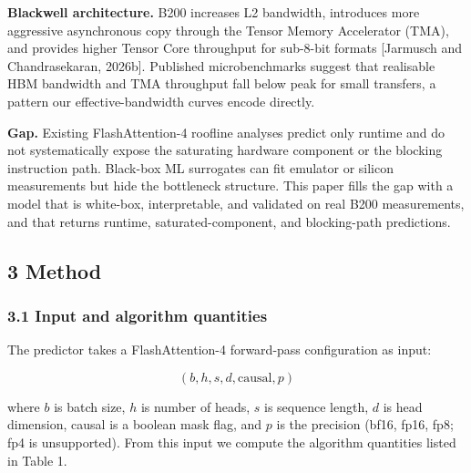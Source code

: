 \documentclass[
  10pt,journal,compsoc,twoside]{IEEEtran}
\begin{document}
\textbf{Blackwell architecture.} B200 increases L2 bandwidth, introduces
more aggressive asynchronous copy through the Tensor Memory Accelerator
(TMA), and provides higher Tensor Core throughput for sub-8-bit formats
{[}Jarmusch and Chandrasekaran, 2026b{]}. Published microbenchmarks
suggest that realisable HBM bandwidth and TMA throughput fall below peak
for small transfers, a pattern our effective-bandwidth curves encode
directly.

\textbf{Gap.} Existing FlashAttention-4 roofline analyses predict only
runtime and do not systematically expose the saturating hardware
component or the blocking instruction path. Black-box ML surrogates can
fit emulator or silicon measurements but hide the bottleneck structure.
This paper fills the gap with a model that is white-box, interpretable,
and validated on real B200 measurements, and that returns runtime,
saturated-component, and blocking-path predictions.

\subsection{3 Method}\label{method}

\subsubsection{3.1 Input and algorithm
quantities}\label{input-and-algorithm-quantities}

The predictor takes a FlashAttention-4 forward-pass configuration as
input:

\[(b, h, s, d, \text{causal}, p)
\]

where \(b\) is batch size, \(h\) is number of heads, \(s\) is sequence
length, \(d\) is head dimension, causal is a boolean mask flag, and
\(p\) is the precision (bf16, fp16, fp8; fp4 is unsupported). From this
input we compute the algorithm quantities listed in Table 1.
\end{document}

